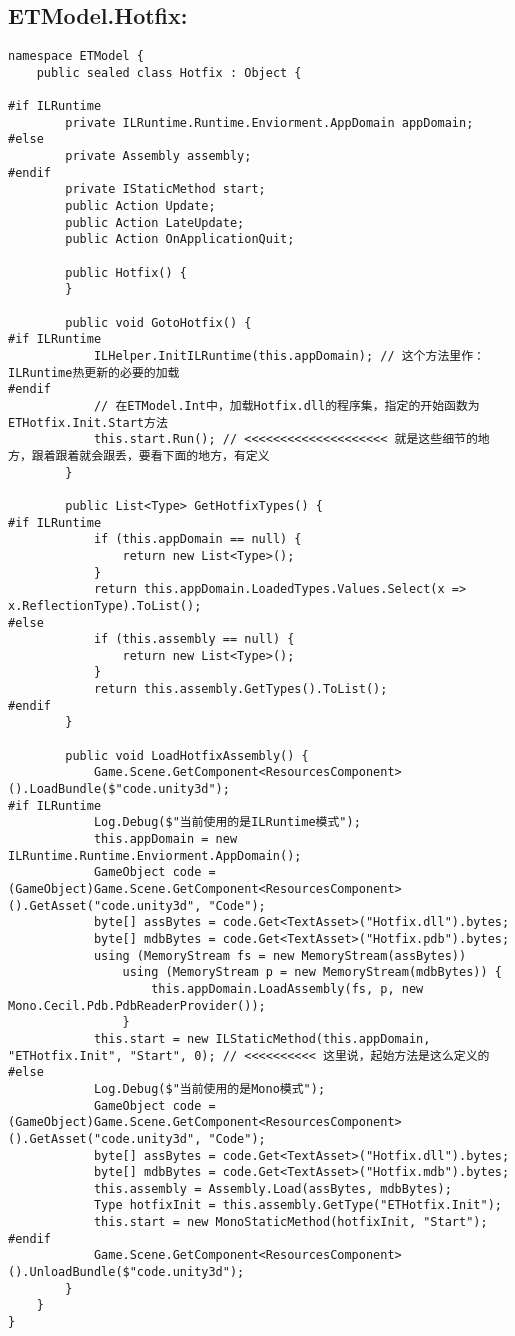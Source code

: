 \documentclass[9pt, b5paper]{article}
\begin{document}
\subsection{ETModel.Hotfix:}
\label{sec-1-2}
\begin{verbatim}
namespace ETModel {
    public sealed class Hotfix : Object {

#if ILRuntime
        private ILRuntime.Runtime.Enviorment.AppDomain appDomain;
#else
        private Assembly assembly;
#endif
        private IStaticMethod start;
        public Action Update;
        public Action LateUpdate;
        public Action OnApplicationQuit;

        public Hotfix() {
        }

        public void GotoHotfix() {
#if ILRuntime
            ILHelper.InitILRuntime(this.appDomain); // 这个方法里作：ILRuntime热更新的必要的加载
#endif
            // 在ETModel.Int中，加载Hotfix.dll的程序集，指定的开始函数为ETHotfix.Init.Start方法
            this.start.Run(); // <<<<<<<<<<<<<<<<<<<< 就是这些细节的地方，跟着跟着就会跟丢，要看下面的地方，有定义
        }

        public List<Type> GetHotfixTypes() {
#if ILRuntime
            if (this.appDomain == null) {
                return new List<Type>();
            }
            return this.appDomain.LoadedTypes.Values.Select(x => x.ReflectionType).ToList();
#else
            if (this.assembly == null) {
                return new List<Type>();
            }
            return this.assembly.GetTypes().ToList();
#endif
        }

        public void LoadHotfixAssembly() {
            Game.Scene.GetComponent<ResourcesComponent>().LoadBundle($"code.unity3d");
#if ILRuntime
            Log.Debug($"当前使用的是ILRuntime模式");
            this.appDomain = new ILRuntime.Runtime.Enviorment.AppDomain();
            GameObject code = (GameObject)Game.Scene.GetComponent<ResourcesComponent>().GetAsset("code.unity3d", "Code");
            byte[] assBytes = code.Get<TextAsset>("Hotfix.dll").bytes;
            byte[] mdbBytes = code.Get<TextAsset>("Hotfix.pdb").bytes;
            using (MemoryStream fs = new MemoryStream(assBytes))
                using (MemoryStream p = new MemoryStream(mdbBytes)) {
                    this.appDomain.LoadAssembly(fs, p, new Mono.Cecil.Pdb.PdbReaderProvider());
                }
            this.start = new ILStaticMethod(this.appDomain, "ETHotfix.Init", "Start", 0); // <<<<<<<<<< 这里说，起始方法是这么定义的
#else
            Log.Debug($"当前使用的是Mono模式");
            GameObject code = (GameObject)Game.Scene.GetComponent<ResourcesComponent>().GetAsset("code.unity3d", "Code");
            byte[] assBytes = code.Get<TextAsset>("Hotfix.dll").bytes;
            byte[] mdbBytes = code.Get<TextAsset>("Hotfix.mdb").bytes;
            this.assembly = Assembly.Load(assBytes, mdbBytes);
            Type hotfixInit = this.assembly.GetType("ETHotfix.Init");
            this.start = new MonoStaticMethod(hotfixInit, "Start");
#endif
            Game.Scene.GetComponent<ResourcesComponent>().UnloadBundle($"code.unity3d");
        }
    }
}
\end{verbatim}
\end{document}
